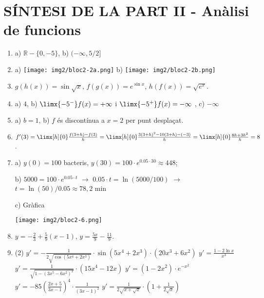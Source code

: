 \section*{SÍNTESI DE LA PART II - Anàlisi de funcions}
\begin{enumerate}
	\item a) $\mathbb{R}-\{0, -5\}$, b) $(-\infty, 5/2]$
	\item a) 
		\texttt{[image: img2/bloc2-2a.png]}
	 b)	
	\texttt{[image: img2/bloc2-2b.png]}

	\item $g(h(x))=\sin \sqrt{x}$, $f(g(x))=e^{\sin x}$, $h(f(x))=\sqrt{e^x}$.
	\item a) $4$, b) $\limx{-5^-} f(x)=+\infty$ i $\limx{-5^+} f(x)=-\infty$ , c) $-\infty$
	\item a) $b=1$, b) $f$ és discontínua a $x=2$ per punt desplaçat.
	\item $f'(3)=\limx[h]{0} \frac{f(3+h)-f(3)}{h}= \limx[h]{0} \frac{3(3+h)^2-10(3+h)-(-3)}{h} = \limx[h]{0} \frac{8h+3h^2}{h}=8$.
	\item \begin{minipage}[t]{0.5\textwidth} a) $y(0)=100$ bacteris, $y(30)=100\cdot e^{0.05\cdot 30}\approx 448$;  
	
	b) $5000 = 100\cdot e^{0.05\cdot t}$ $\rightarrow$ $0.05\cdot t = \ln(5000/100)$ $\rightarrow$  $t = \ln(50)/0.05 \approx 78,2 $  min
\end{minipage}
\begin{minipage}[t]{0.5\textwidth}
		\begin{center}
			c) Gràfica
			
		\texttt{[image: img2/bloc2-6.png]}
	\end{center}
\end{minipage}
	
	\item $y=-\frac{2}{3}+\frac{5}{9}(x-1)$,   $y=\frac{5x}{9}-\frac{11}{9}$.
	
	\item \begin{tasks}(2)
		\task $y'=-\frac{1}{2\sqrt{\cos(5x^4+2x^3)}}\cdot \sin(5x^4+2x^3) \cdot (20x^3+6x^2)$
		\task $y'=\frac{1-2\ln x}{x^3}$
		\task $y'=\frac{1}{\sqrt{1-(3x^5-6x^2)^2}}\cdot (15x^4-12x)$
		\task $y'=(1-2x^2)\cdot e^{-x^2}$
		\task $y'=-85\left( \frac{2x+5}{3x-1} \right)^4 \cdot \frac{1}{(3x-1)^2}$
		\task $y'=\frac{1}{2\sqrt{x+\sqrt{x}}}\cdot (1+\frac{1}{2\sqrt{x}})$
		\end{tasks}
	

\end{enumerate}
